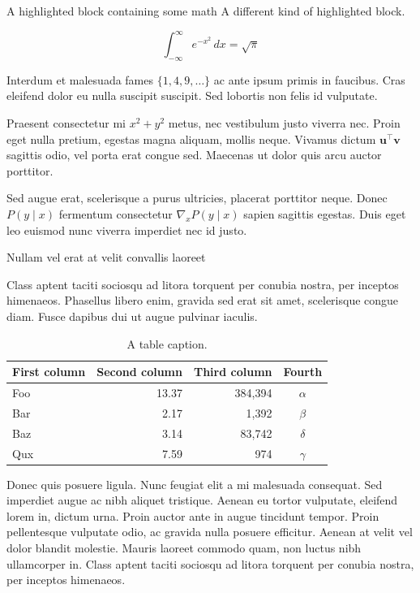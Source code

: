 \documentclass[final]{beamer}
\newlength{\colwidth}
\begin{document}
\begin{frame}[t]
\begin{columns}[t]
\begin{column}{\colwidth}
\begin{exampleblock}{A highlighted block containing some math}
    A different kind of highlighted block.

    $$
    \int_{-\infty}^{\infty} e^{-x^2}\,dx = \sqrt{\pi}
    $$

    Interdum et malesuada fames $\{1, 4, 9, \ldots\}$ ac ante ipsum primis in
    faucibus. Cras eleifend dolor eu nulla suscipit suscipit. Sed lobortis non
    felis id vulputate.


    Praesent consectetur mi $x^2 + y^2$ metus, nec vestibulum justo viverra
    nec. Proin eget nulla pretium, egestas magna aliquam, mollis neque. Vivamus
    dictum $\mathbf{u}^\intercal\mathbf{v}$ sagittis odio, vel porta erat
    congue sed. Maecenas ut dolor quis arcu auctor porttitor.


    Sed augue erat, scelerisque a purus ultricies, placerat porttitor neque.
    Donec $P(y \mid x)$ fermentum consectetur $\nabla_x P(y \mid x)$ sapien
    sagittis egestas. Duis eget leo euismod nunc viverra imperdiet nec id
    justo.

  \end{exampleblock}

  \begin{block}{Nullam vel erat at velit convallis laoreet}

    Class aptent taciti sociosqu ad litora torquent per conubia nostra, per
    inceptos himenaeos. Phasellus libero enim, gravida sed erat sit amet,
    scelerisque congue diam. Fusce dapibus dui ut augue pulvinar iaculis.

    \begin{table}
      \centering
      \begin{tabular}{l r r c}
        \toprule
        \textbf{First column} & \textbf{Second column} & \textbf{Third column} & \textbf{Fourth} \\
        \midrule
        Foo & 13.37 & 384,394 & $\alpha$ \\
        Bar & 2.17 & 1,392 & $\beta$ \\
        Baz & 3.14 & 83,742 & $\delta$ \\
        Qux & 7.59 & 974 & $\gamma$ \\
        \bottomrule
      \end{tabular}
      \caption{A table caption.}
    \end{table}

    Donec quis posuere ligula. Nunc feugiat elit a mi malesuada consequat. Sed
    imperdiet augue ac nibh aliquet tristique. Aenean eu tortor vulputate,
    eleifend lorem in, dictum urna. Proin auctor ante in augue tincidunt
    tempor. Proin pellentesque vulputate odio, ac gravida nulla posuere
    efficitur. Aenean at velit vel dolor blandit molestie. Mauris laoreet
    commodo quam, non luctus nibh ullamcorper in. Class aptent taciti sociosqu
    ad litora torquent per conubia nostra, per inceptos himenaeos.


\end{block}
\end{column}
\end{columns}
\end{frame}
\end{document}
